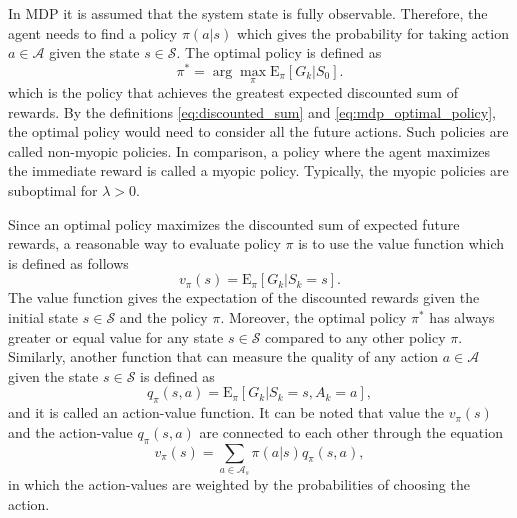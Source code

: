\documentclass[english, 12pt, a4paper, elec, utf8, a-1b, online]{aaltothesis}
\newcommand{\Epolicy}[1]{\mathrm{E}_\pi \left[ #1 \right]}
\newcommand{\Ss}{\mathcal{S}}
\newcommand{\As}{\mathcal{A}}
\begin{document}
In MDP it is assumed that the system state is fully observable.
Therefore, the agent needs to find a policy $\pi(a | s)$ which gives the probability for taking action $a \in \As$ given the state $s \in \Ss$.
The optimal policy is defined as
\begin{equation}\label{eq:mdp_optimal_policy}
    \pi^* = \arg\max_\pi\Epolicy{G_k | S_0}.
\end{equation}
which is the policy that achieves the greatest expected discounted sum of rewards.
By the definitions \eqref{eq:discounted_sum} and \eqref{eq:mdp_optimal_policy}, the optimal policy would need to consider all the future actions.
Such policies are called non-myopic policies.
In comparison, a policy where the agent maximizes the immediate reward is called a myopic policy. 
Typically, the myopic policies are suboptimal for $\lambda>0$.

Since an optimal policy maximizes the discounted sum of expected future rewards, a reasonable way to evaluate policy $\pi$ is to use the value function which is defined as follows
\begin{equation} \label{eq:value}
    v_\pi(s) = \Epolicy{G_k | S_k=s}.
\end{equation}
The value function gives the expectation of the discounted rewards given the initial state $s \in \Ss$ and the policy $\pi$.
Moreover, the optimal policy $\pi^*$ has always greater or equal value for any state $s \in \Ss$ compared to any other policy $\pi$.
Similarly, another function that can measure the quality of any action $a \in \As$ given the state $s \in \Ss$ is defined as
\begin{equation}\label{eq:action_value}
    q_\pi(s, a) = \Epolicy{G_k | S_k=s, A_k=a},
\end{equation}
and it is called an action-value function.
It can be noted that value the $v_\pi(s)$ and the action-value $ q_\pi(s, a)$ are connected to each other through the equation  
\begin{equation}
 v_\pi(s) =  \sum_{a\in \As_s} \pi(a | s) q_\pi(s, a),
\end{equation}
in which the action-values are weighted by the probabilities of choosing the action.
\end{document}
